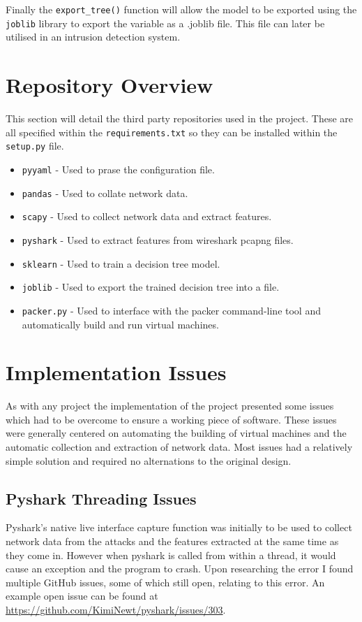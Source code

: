 Finally the \texttt{export\_tree()} function will allow the model to be exported using the \texttt{joblib} library to export the variable as a .joblib file. This file can later be utilised in an intrusion detection system.

\section{Repository Overview}
This section will detail the third party repositories used in the project. These are all specified within the \texttt{requirements.txt} so they can be installed within the \texttt{setup.py} file.
\begin{itemize}
    \item \texttt{pyyaml} - Used to prase the configuration file.
    \item \texttt{pandas} - Used to collate network data.
    \item \texttt{scapy} - Used to collect network data and extract features.
    \item \texttt{pyshark} - Used to extract features from wireshark pcapng files.
    \item \texttt{sklearn} - Used to train a decision tree model.
    \item \texttt{joblib} - Used to export the trained decision tree into a file.
    \item \texttt{packer.py} - Used to interface with the packer command-line tool and automatically build and run virtual machines.
\end{itemize}

\section{Implementation Issues}
As with any project the implementation of the project presented some issues which had to be overcome to ensure a working piece of software. These issues were generally centered on automating the building of virtual machines and the automatic collection and extraction of network data. Most issues had a relatively simple solution and required no alternations to the original design.
\subsection{Pyshark Threading Issues}
Pyshark’s native live interface capture function was initially to be used to collect network data from the attacks and the features extracted at the same time as they come in. However when pyshark is called from within a thread, it would cause an exception and the program to crash. Upon researching the error I found multiple GitHub issues, some of which still open, relating to this error. An example open issue can be found at \url{https://github.com/KimiNewt/pyshark/issues/303}. 

